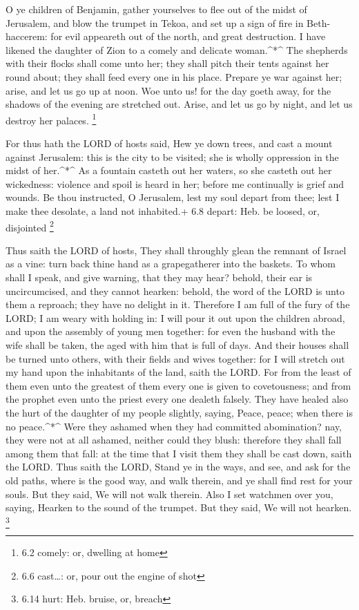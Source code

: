  O ye children of Benjamin, gather yourselves to flee out of
the midst of Jerusalem, and blow the trumpet in Tekoa, and set up a sign
of fire in Beth-haccerem: for evil appeareth out of the north, and great
destruction.  I have likened the daughter of Zion to a
comely and delicate woman.\^{}*\^{}  The shepherds with
their flocks shall come unto her; they shall pitch their tents against
her round about; they shall feed every one in his place. 
Prepare ye war against her; arise, and let us go up at noon. Woe unto
us! for the day goeth away, for the shadows of the evening are stretched
out.  Arise, and let us go by night, and let us destroy her
palaces. \footnote{6.2 comely: or, dwelling at home}

 For thus hath the LORD of hosts said, Hew ye down trees,
and cast a mount against Jerusalem: this is the city to be visited; she
is wholly oppression in the midst of her.\^{}*\^{}  As a
fountain casteth out her waters, so she casteth out her wickedness:
violence and spoil is heard in her; before me continually is grief and
wounds.  Be thou instructed, O Jerusalem, lest my soul
depart from thee; lest I make thee desolate, a land not inhabited.+ 6.8
depart: Heb. be loosed, or, disjointed \footnote{6.6 cast\ldots: or,
  pour out the engine of shot}

 Thus saith the LORD of hosts, They shall throughly glean
the remnant of Israel as a vine: turn back thine hand as a grapegatherer
into the baskets.  To whom shall I speak, and give warning,
that they may hear? behold, their ear is uncircumcised, and they cannot
hearken: behold, the word of the LORD is unto them a reproach; they have
no delight in it.  Therefore I am full of the fury of the
LORD; I am weary with holding in: I will pour it out upon the children
abroad, and upon the assembly of young men together: for even the
husband with the wife shall be taken, the aged with him that is full of
days.  And their houses shall be turned unto others, with
their fields and wives together: for I will stretch out my hand upon the
inhabitants of the land, saith the LORD.  For from the
least of them even unto the greatest of them every one is given to
covetousness; and from the prophet even unto the priest every one
dealeth falsely.  They have healed also the hurt of the
daughter of my people slightly, saying, Peace, peace; when there is no
peace.\^{}*\^{}  Were they ashamed when they had committed
abomination? nay, they were not at all ashamed, neither could they
blush: therefore they shall fall among them that fall: at the time that
I visit them they shall be cast down, saith the LORD.  Thus
saith the LORD, Stand ye in the ways, and see, and ask for the old
paths, where is the good way, and walk therein, and ye shall find rest
for your souls. But they said, We will not walk therein. 
Also I set watchmen over you, saying, Hearken to the sound of the
trumpet. But they said, We will not hearken. \footnote{6.14 hurt: Heb.
  bruise, or, breach}

